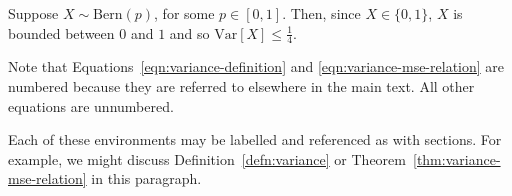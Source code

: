 \begin{example}
    Suppose $X \sim \mathrm{Bern} (p)$, for some $p \in [0,1]$. Then, 
    since $X \in \{0, 1\}$, $X$ is bounded between $0$ and $1$ and so
    $\mathrm{Var}[X] \leq \tfrac{1}{4}$.
\end{example}

Note that Equations~\eqref{eqn:variance-definition} and \eqref{eqn:variance-mse-relation} are numbered because they are referred to elsewhere in the main text. All other equations are unnumbered. 

Each of these environments may be labelled and referenced as with sections. For example, we might discuss Definition~\ref{defn:variance} or Theorem~\ref{thm:variance-mse-relation} in this paragraph. 
